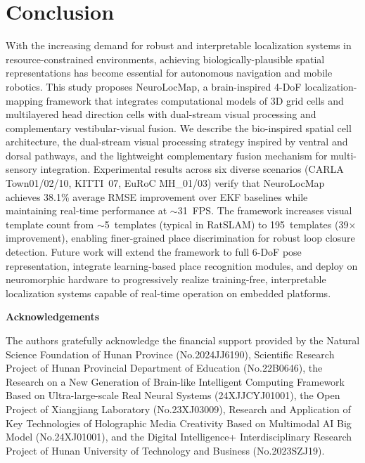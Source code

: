 \documentclass[preprint,12pt]{elsarticle}
\begin{document}
\section{Conclusion}
\label{sec:conclusion}

With the increasing demand for robust and interpretable localization systems in resource-constrained environments, achieving biologically-plausible spatial representations has become essential for autonomous navigation and mobile robotics. This study proposes NeuroLocMap, a brain-inspired 4-DoF localization-mapping framework that integrates computational models of 3D grid cells and multilayered head direction cells with dual-stream visual processing and complementary vestibular-visual fusion. We describe the bio-inspired spatial cell architecture, the dual-stream visual processing strategy inspired by ventral and dorsal pathways, and the lightweight complementary fusion mechanism for multi-sensory integration. Experimental results across six diverse scenarios (CARLA Town01/02/10, KITTI~07, EuRoC MH\_01/03) verify that NeuroLocMap achieves 38.1\% average RMSE improvement over EKF baselines while maintaining real-time performance at $\sim$31~FPS. The framework increases visual template count from $\sim$5~templates (typical in RatSLAM) to 195~templates (39$\times$ improvement), enabling finer-grained place discrimination for robust loop closure detection. Future work will extend the framework to full 6-DoF pose representation, integrate learning-based place recognition modules, and deploy on neuromorphic hardware to progressively realize training-free, interpretable localization systems capable of real-time operation on embedded platforms.

\vspace{2em}

\noindent \textbf{Acknowledgements}
\vspace{1em}

The authors gratefully acknowledge the financial support provided by the Natural Science Foundation of Hunan Province (No.2024JJ6190), Scientific Research Project of Hunan Provincial Department of Education (No.22B0646), the Research on a New Generation of Brain-like Intelligent Computing Framework Based on Ultra-large-scale Real Neural Systems (24XJJCYJ01001), the Open Project of Xiangjiang Laboratory (No.23XJ03009), Research and Application of Key Technologies of Holographic Media Creativity Based on Multimodal AI Big Model (No.24XJ01001), and the Digital Intelligence+ Interdisciplinary Research Project of Hunan University of Technology and Business (No.2023SZJ19).
\end{document}
